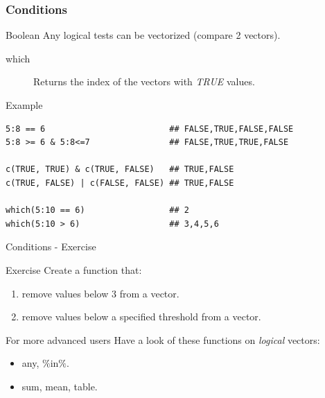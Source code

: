 \documentclass[10pt]{beamer}
\newenvironment{xframe}[2][]
  {\begin{frame}[fragile,environment=xframe,#1]
  \frametitle{#2}}
  {\end{frame}}
\begin{document}
\begin{xframe}{Conditions}
  \begin{block}{Boolean}
  Any logical tests can be vectorized (compare 2 {\sf vector}s).
    \begin{description}
    \item[which] Returns the index of the {\sf vector}s with {\it TRUE} values.
    \end{description}
  \end{block}
  \begin{exampleblock}{Example}
\begin{verbatim}
5:8 == 6                         ## FALSE,TRUE,FALSE,FALSE
5:8 >= 6 & 5:8<=7                ## FALSE,TRUE,TRUE,FALSE

c(TRUE, TRUE) & c(TRUE, FALSE)   ## TRUE,FALSE
c(TRUE, FALSE) | c(FALSE, FALSE) ## TRUE,FALSE

which(5:10 == 6)                 ## 2
which(5:10 > 6)                  ## 3,4,5,6
\end{verbatim}  
  \end{exampleblock}
\end{xframe}

\begin{frame}{Conditions - Exercise}
  \begin{block}{Exercise}
  Create a function that: 
  \begin{enumerate}
  \item remove values below $3$ from a {\sf vector}.
  \item  remove values below a specified threshold from a {\sf vector}.
  \end{enumerate}
  \end{block}

  \vspace{.2\textheight}

  \begin{block}{For more advanced users}
    Have a look of these functions on {\it logical} vectors:
    \begin{itemize}
    \item any, $\%$in$\%$.
    \item sum, mean, table.
    \end{itemize}
  \end{block}
\end{frame}
\end{document}

